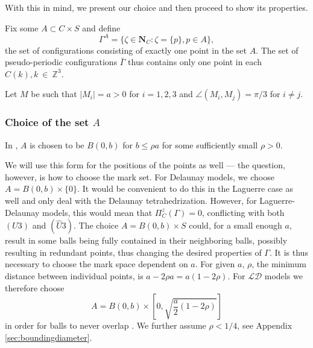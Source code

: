 With this in mind, we present our choice and then proceed to show its properties.\newline 

\noindent Fix some $A \subset C\times S$ and define
$$\Gamma^A = \{\zeta \in \mathbf N_C: \zeta = \{p\}, p \in A\},$$
the set of configurations consisting of exactly one point in the set $A$. The set of pseudo-periodic configurations $\bar\Gamma$ thus contains only one point in each $C(k), k~\in~\mathbb Z^3$.

Let $M$ be such that $|M_i| = a > 0$ for $i=1,2,3$ and $\angle(M_i,M_j) = \pi / 3$ for $i\neq j$.

\subsubsection{Choice of the set $A$}
In \cite{DDG12}, $A$ is chosen to be $B(0,b)$ for $b\leq \rho a$ for some sufficiently small $\rho >0$. 

We will use this form for the positions of the points as well --- the question, however, is how to choose the mark set. For Delaunay models, we choose $A=B(0,b)\times\{0\}$. It would be convenient to do this in the Laguerre case as well and only deal with the Delaunay tetrahedrization. However, for Laguerre-Delaunay models, this  would mean that $\Pi^z_C(\Gamma) = 0$, conflicting with both $(U3)$ and $(\hat U3)$. The choice $A=B(0,b)\times S$ could, for a small enough $a$, result in some balls being fully contained in their neighboring balls, possibly resulting in redundant points, thus changing the desired properties of $\Gamma$. It is thus necessary to choose the mark space dependent on $a$. For given $a$, $\rho$, the minimum distance between individual points, is $a-2\rho a = a(1-2\rho)$. For $\mathcal {LD}$ models we therefore choose 
$$A = B(0,b)\times \left[0, \sqrt{\frac a2(1-2\rho)}\right]$$ 
in order for balls to never overlap . We further assume $\rho < 1/4$, see Appendix \ref{sec:boundingdiameter}.




